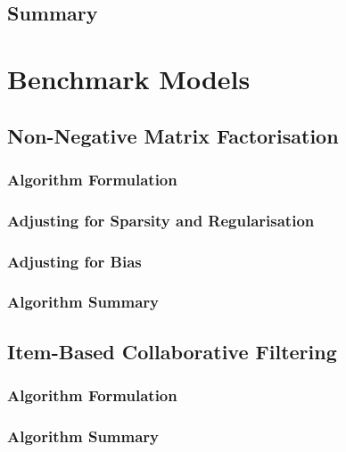 \subsection{Summary}

\section{Benchmark Models}
\label{sec:Benchmark Models}

\subsection{Non-Negative Matrix Factorisation}
\label{subsec:Non-Negative Matrix Factorisation}

\subsubsection{Algorithm Formulation}
\label{subsubsec:Algorithm Formulation}

\subsubsection{Adjusting for Sparsity and Regularisation}
\label{subsubsec:Adjusting for Sparsity and Regularisation}

\subsubsection{Adjusting for Bias}
\label{subsubsec:Adjusting for Bias}

\subsubsection{Algorithm Summary}
\label{subsubsec:Algorithm Summary}

\subsection{Item-Based Collaborative Filtering}
\label{subsec:Item-Based Collaborative Filtering}

\subsubsection{Algorithm Formulation}
\label{subsubsec:Algorithm Formulation}

\subsubsection{Algorithm Summary}
\label{subsubsec:Algorithm Summary}

